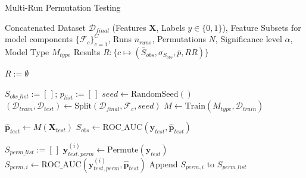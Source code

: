 \begin{algorithm}[H]
    \caption[Permutation Testing]{Multi-Run Permutation Testing}
    \label{alg:permutation_testing_symbolic}
    \begin{algorithmic}[1]
        \footnotesize %

        \Require %
        \Statex \hspace{\algorithmicindent} Concatenated Dataset $\mathcal{D}_{final}$ (Features $\mathbf{X}$, Labels $y \in \{0,1\}$),
        \Statex \hspace{\algorithmicindent} Feature Subsets for model components $\{\mathcal{F}_c\}_{c=1}^C$,
        \Statex \hspace{\algorithmicindent} Runs $n_{runs}$, Permutations $N$, Significance level $\alpha$, Model Type $M_{type}$ 
        \Ensure %
        \Statex \hspace{\algorithmicindent} Results $R : \{c \mapsto (\bar{S}_{obs}, \sigma_{S_{obs}}, \bar{p}, RR)\}$ 
        \medskip

        \State $R := \emptyset$ 
        \medskip

        \State $S_{obs\_list} := [\,]$; $p_{list} := [\,]$ 
        \medskip
        \State $seed \leftarrow \text{RandomSeed}()$
        \State $(\mathcal{D}_{train}, \mathcal{D}_{test}) \leftarrow \text{Split}(\mathcal{D}_{final}, \mathcal{F}_c, seed)$ 
        \State $M \leftarrow \text{Train}(M_{type}, \mathcal{D}_{train})$ 
        \medskip

        \State $\hat{\mathbf{p}}_{test} \leftarrow M(\mathbf{X}_{test})$ 
        \State $S_{obs} \leftarrow \text{ROC\_AUC}(\mathbf{y}_{test}, \hat{\mathbf{p}}_{test})$ 
        \medskip

        \State $S_{perm\_list} := [\,]$
        \State $\mathbf{y}_{test, perm}^{(i)} \leftarrow \text{Permute}(\mathbf{y}_{test})$ 
        \State $S_{perm, i} \leftarrow \text{ROC\_AUC}(\mathbf{y}_{test, perm}^{(i)}, \hat{\mathbf{p}}_{test})$ 
        \State Append $S_{perm, i}$ to $S_{perm\_list}$
        \EndFor
        \medskip


\end{algorithmic}
\end{algorithm}

